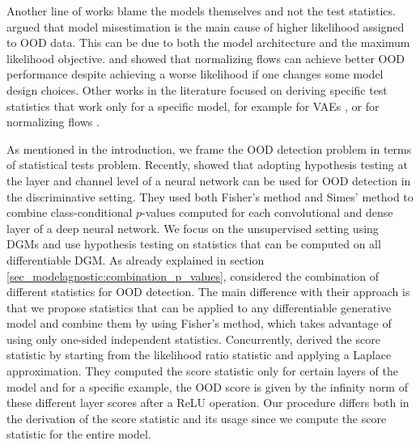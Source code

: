 {Another line of works blame the models themselves and not the test statistics. \textcite{zhang_understanding_2021} argued that model misestimation is the main cause of higher likelihood assigned to OOD data. This can be due to both the model architecture and the maximum likelihood objective. \textcite{kirichenko_why_2020} and \textcite{schirrmeister_understanding_2020} showed that normalizing flows can achieve better OOD performance despite achieving a worse likelihood if one changes some model design choices.
%
Other works in the literature focused on deriving specific test statistics that work only for a specific model, for example for VAEs \parencite{xiao_likelihood_2020, maaloe_biva_2019, havtorn_hierarchical_2021}, or for normalizing flows \parencite{kirichenko_why_2020, ahmadian_likelihoodfree_2021}.


As mentioned in the introduction, we frame the OOD detection problem in terms of statistical tests problem. Recently, \textcite{haroush_statistical_2021} showed that adopting hypothesis testing at the layer and channel level of a neural network can be used for OOD detection in the discriminative setting. They used both Fisher's method and Simes' method to combine class-conditional $p$-values computed for each convolutional and dense layer of a deep neural network. We focus on the unsupervised setting using DGMs and use hypothesis testing on statistics that can be computed on all differentiable DGM. As already explained in section \cref{sec_modelagnostic:combination_p_values}, \textcite{morningstar_density_2021} considered the combination of different statistics for OOD detection. The main difference with their approach is that we propose statistics that can be applied to any differentiable generative model and combine them by using Fisher's method, which takes advantage of using only one-sided independent statistics. Concurrently, \textcite{choi_robust_2021} derived the score statistic by starting from the likelihood ratio statistic and applying a Laplace approximation. They computed the score statistic only for certain layers of the model and for a specific example, the OOD score is given by the infinity norm of these different layer scores after a ReLU operation. Our procedure differs both in the derivation of the score statistic and its usage since we compute the score statistic for the entire model.

}
